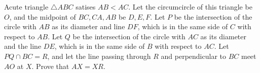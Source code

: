 Acute triangle $\triangle ABC$ satises $AB < AC$. Let the circumcircle of this triangle be $O$, and the midpoint of $BC,CA,AB$ be $D,E,F$. Let $P$ be the intersection of the circle with $AB$ as its diameter and line $DF$, which is in the same side of $C$ with respect to $AB$. Let $Q$ be the intersection of the circle with $AC$ as its diameter and the line $DE$, which is in the same side of $B$ with respect to $AC$. Let $PQ \cap BC = R$, and let the line passing through $R$ and perpendicular to $BC$ meet $AO$ at $X$. Prove that $AX = XR$.